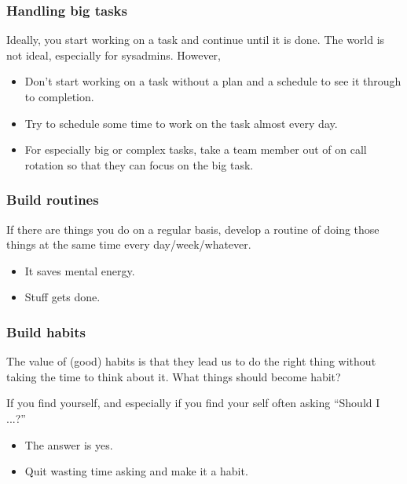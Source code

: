 \documentclass[10pt]{beamer}
\begin{document}
\begin{frame}
  \frametitle{Handling big tasks}
  
   Ideally, you start working on a task and continue until it is done.
   The world is not ideal, especially for sysadmins. However,
   
   \begin{itemize}
     \item Don't start working on a task without a plan and a schedule
     to see it through to completion.
     \item Try to schedule some time to work on the task almost every day.
     \item For especially big or complex tasks, take a team member out of
     on call rotation so that they can focus on the big task.
   \end{itemize}
   
\end{frame}
\begin{frame}
  \frametitle{Build routines}
  
    If there are things you do on a regular basis, develop a routine of doing 
    those things at the same time every day/week/whatever.
    
    \begin{itemize}
      \item It saves mental energy.
      \item Stuff gets done.
    \end{itemize}
     
\end{frame}

\begin{frame}
  \frametitle{Build habits}
  
    The value of (good) habits is that they lead us to do the right thing without 
    taking the time to think about it. What things should become habit?   
    
    If you find yourself, and especially if you find your self often asking ``Should I ...?''
    
    \begin{itemize}
      \item The answer is yes.
      \item Quit wasting time asking and make it a habit.
    \end{itemize}
     
\end{frame}
\end{document}
